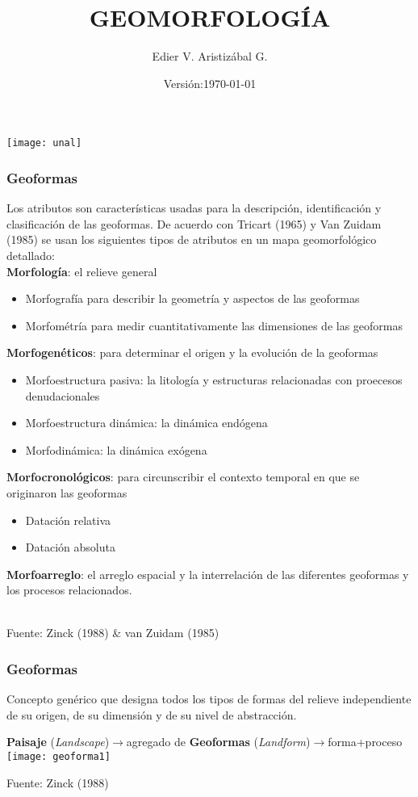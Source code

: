\documentclass{beamer}
\title[Geoforma: Componente Externo]{GEOMORFOLOGÍA}
\author[Edier Aristizabal]{Edier V. Aristizábal G.}
\institute{evaristizabalg@unal.edu.co}
\date{\tiny{Versión:\today}}
\begin{document}
\begin{frame}
\titlepage
\centering
   	\texttt{[image: unal]} 
\end{frame}
\begin{frame}
\frametitle{Geoformas}
\scriptsize{Los atributos son características usadas para la descripción, identificación y clasificación de las geoformas. De acuerdo con Tricart (1965) y Van Zuidam (1985) se usan los siguientes tipos de atributos en un mapa geomorfológico detallado:\\
\vspace{5pt}
\textbf{Morfología}: el relieve general
\begin{itemize}
\item Morfografía para describir la geometría y aspectos de las geoformas
\item Morfométría para medir cuantitativamente las dimensiones de las geoformas
\end{itemize}
\textbf{Morfogenéticos}: para determinar el origen y la evolución de la geoformas
\begin{itemize}
\item Morfoestructura pasiva: la litología y estructuras relacionadas con proecesos denudacionales
\item Morfoestructura dinámica: la dinámica endógena
\item Morfodinámica: la dinámica exógena 
\end{itemize}
\textbf{Morfocronológicos}: para circunscribir el contexto temporal en que se originaron las geoformas
\begin{itemize}
\item Datación relativa
\item Datación absoluta
\end{itemize}
\textbf{Morfoarreglo}: el arreglo espacial y la interrelación de las diferentes geoformas y los procesos relacionados.
}\\
\vspace{5pt}
\tiny{Fuente: Zinck (1988) \& van Zuidam (1985)}
\end{frame}
\begin{frame}
\frametitle{Geoformas}
\small{Concepto genérico que designa todos los tipos de formas del relieve independiente de su origen, de su dimensión y de su nivel de abstracción.}
\begin{center}
\small{\textbf{Paisaje} (\emph{Landscape})$\rightarrow$agregado de \textbf{Geoformas} (\emph{Landform})$\rightarrow$forma+proceso}\\
   	\texttt{[image: geoforma1]}
\end{center}
\tiny{Fuente: Zinck (1988)}
\end{frame}
\end{document}
